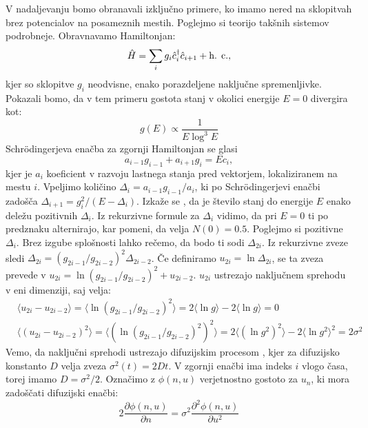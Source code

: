 V nadaljevanju bomo obranavali izključno primere, ko imamo nered na sklopitvah brez potencialov na posameznih mestih. Poglejmo si teorijo takšnih sistemov podrobneje.
Obravnavamo Hamiltonjan:
\begin{equation}
\hat{H} = \sum_i g_i \hat{c}_i^\dagger \hat{c}_{i+1} + \textup{h. c.},
\end{equation}
kjer so sklopitve $g_i$ neodvisne, enako porazdeljene naključne spremenljivke.
Pokazali bomo, da v tem primeru gostota stanj v okolici energije $E=0$ divergira kot:
\begin{equation}
g(E) \propto \frac{1}{E \log^3 E}
\end{equation}
Schrödingerjeva enačba za zgornji Hamiltonjan se glasi
\begin{equation}
a_{i-1} g_{i-1} + a_{i+1} g_i = E c_i,
\end{equation}
kjer je $a_i$ koeficient v razvoju lastnega stanja pred vektorjem, lokaliziranem na mestu $i$.
Vpeljimo količino $\Delta_i = a_{i-1} g_{i-1} / a_i$, ki po Schrödingerjevi enačbi zadošča $\Delta_{i+1} = g_i^2 / (E- \Delta_i)$. Izkaže se \cite{dokazgostota}, da je število stanj do energije $E$ enako deležu pozitivnih $\Delta_i$. Iz rekurzivne formule za $\Delta_i$ vidimo, da pri $E=0$ ti po predznaku alternirajo, kar pomeni, da velja $N(0) = 0.5$.
Poglejmo si pozitivne $\Delta_i$. Brez izgube splošnosti lahko rečemo, da bodo ti sodi $\Delta_{2i}$.
Iz rekurzivne zveze sledi $\Delta_{2i} = (g_{2i-1}/g_{2i-2})^2 \Delta_{2i-2}$.
Če definiramo $u_{2i} = \ln \Delta_{2i}$, se ta zveza prevede v $u_{2i} = \ln (g_{2i-1}/g_{2i-2})^2 + u_{2i-2}$.
$u_{2i}$ ustrezajo naključnem sprehodu v eni dimenziji, saj velja:
\begin{align}
&\langle u_{2i} - u_{2i-2} \rangle = \langle \ln (g_{2i-1}/g_{2i-2})^2 \rangle = 2 \langle \ln g \rangle - 2 \langle \ln g \rangle = 0 \\
&\langle (u_{2i} - u_{2i-2})^2 \rangle = \langle (\ln (g_{2i-1}/g_{2i-2})^2)^2 \rangle = 2 \langle (\ln g^2)^2 \rangle - 2 \langle \ln g^2 \rangle^2 = 2 \sigma^2 
\end{align}
Vemo, da naključni sprehodi ustrezajo difuzijskim procesom \cite{diffusion}, kjer za difuzijsko konstanto $D$ velja zveza $\sigma^2(t) = 2Dt$. V zgornji enačbi ima indeks $i$ vlogo časa, torej imamo $D=\sigma^2 / 2$. Označimo z $\phi (n, u)$ verjetnostno gostoto za $u_n$, ki mora zadoščati difuzijski enačbi:
\begin{equation}
2 \frac{\partial \phi (n,u)}{\partial n} = \sigma^2 \frac{\partial^2 \phi (n,u)}{\partial u^2}
\end{equation}
